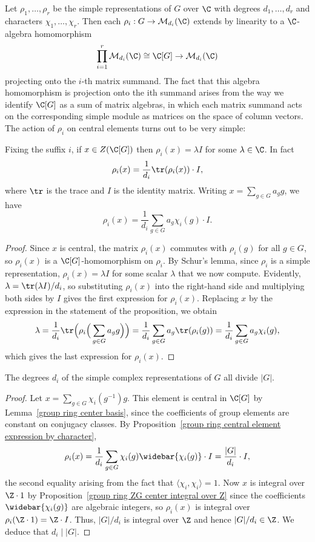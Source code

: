 Let $\rho_1,\dots,\rho_r$ be the simple representations of $G$ over $\C$ with degrees $d_1,\dots,d_r$ and characters $\chi_1,\dots,\chi_r$. Then each $\rho_i:G\to\mathcal{M}_{d_i}(\C)$ extends by linearity to a $\C$-algebra homomorphism
\[\prod_{i=1}^{r}\mathcal{M}_{d_i}(\C)\cong\C[G]\to\mathcal{M}_{d_i}(\C)\]
projecting onto the $i$-th matrix summand. The fact that this algebra homomorphism is projection onto the ith summand arises from the way we identify $\C[G]$ as a sum of matrix algebras, in which each matrix summand acts on the corresponding simple module as matrices on the space of column vectors. The action of $\rho_i$ on central elements turns out to be very simple:
\begin{proposition}\label{group ring central element expression by character}
Fixing the suffix $i$, if $x\in Z(\C[G])$ then $\rho_i(x)=\lambda I$ for some $\lambda\in\C$. In fact
\[\rho_i(x)=\frac{1}{d_i}\tr(\rho_i(x))\cdot I,\]
where $\tr$ is the trace and $I$ is the identity matrix. Writing $x=\sum_{g\in G}a_gg$, we have
\[\rho_i(x)=\frac{1}{d_i}\sum_{g\in G}a_g\chi_i(g)\cdot I.\]
\end{proposition}
\begin{proof}
Since $x$ is central, the matrix $\rho_i(x)$ commutes with $\rho_i(g)$ for all $g\in G$, so $\rho_i(x)$ is a $\C[G]$-homomorphism on $\rho_i$. By Schur's lemma, since $\rho_i$ is a simple representation, $\rho_i(x)=\lambda I$ for some scalar $\lambda$ that we now compute. Evidently, $\lambda=\tr(\lambda I)/d_i$, so substituting $\rho_i(x)$ into the right-hand side and multiplying both sides by $I$ gives the first expression for $\rho_i(x)$. Replacing $x$ by the expression in the statement of the proposition, we obtain
\begin{align*}
\lambda=\frac{1}{d_i}\tr\Big(\rho_i\Big(\sum_{g\in G}a_gg\Big)\Big)=\frac{1}{d_i}\sum_{g\in G}a_g\tr(\rho_i(g))=\frac{1}{d_i}\sum_{g\in G}a_g\chi_i(g),
\end{align*}
which gives the last expression for $\rho_i(x)$.
\end{proof}
\begin{theorem}\label{representation degree dividing}
The degrees $d_i$ of the simple complex representations of $G$ all divide $|G|$.
\end{theorem}
\begin{proof}
Let $x=\sum_{g\in G}\chi_i(g^{-1})g$. This element is central in $\C[G]$ by Lemma~\ref{group ring center basis}, since the coefficients of group elements are constant on conjugacy classes. By Proposition~\ref{group ring central element expression by character},
\[\rho_i(x)=\frac{1}{d_i}\sum_{g\in G}\chi_i(g)\widebar{\chi_i(g)}\cdot I=\frac{|G|}{d_i}\cdot I,\]
the second equality arising from the fact that $\langle\chi_i,\chi_i\rangle=1$. Now $x$ is integral over $\Z\cdot 1$ by Proposition~\ref{group ring ZG center integral over Z} since the coefficients $\widebar{\chi_i(g)}$ are algebraic integers, so $\rho_i(x)$ is integral over $\rho_i(\Z\cdot 1)=\Z\cdot I$. Thus, $|G|/d_i$ is integral over $\Z$ and hence $|G|/d_i\in\Z$. We deduce that $d_i\mid |G|$.
\end{proof}
